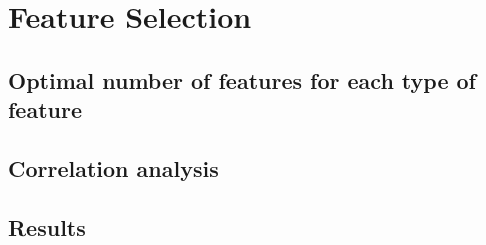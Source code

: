 \section{Feature Selection}

\subsection{Optimal number of features for each type of feature}

\subsection{Correlation analysis}


\subsection{Results}
